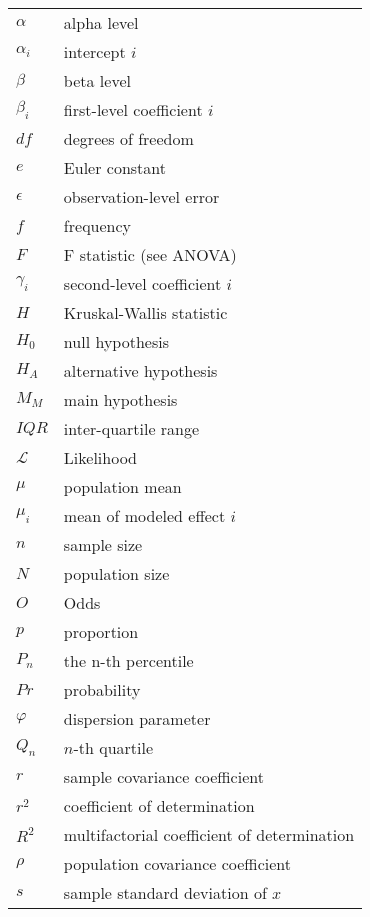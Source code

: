 \begin{longtable}{p{}p{}}
  $\alpha$          & alpha level \\
  $\alpha_i$        & intercept $i$ \\
  $\beta$           & beta level \\
  $\beta_i$         & first-level coefficient $i$ \\
  $df$              & degrees of freedom \\
  $e$               & Euler constant \\
  $\epsilon$        & observation-level error \\
  $f$               & frequency \\
  $F$               & F statistic (see ANOVA)\\
  $\gamma_i$        & second-level coefficient $i$ \\
  $H$               & Kruskal-Wallis statistic \\
  $H_0$             & null hypothesis \\
  $H_A$             & alternative hypothesis \\
  $M_M$             & main hypothesis \\
  $IQR$             & inter-quartile range \\
  $\mathcal{L}$     & Likelihood \\
  $\mu$             & population mean \\
  $\mu_i$           & mean of modeled effect $i$ \\
  $n$               & sample size \\
  $N$               & population size \\
  $O$               & Odds \\
  $p$               & proportion \\
  $P_n$             & the n-th percentile \\
  $Pr$              & probability \\
  $\varphi$         & dispersion parameter \\
  $Q_n$             & $n$-th quartile \\
  $r$               & sample covariance coefficient \\
  $r^2$             & coefficient of determination \\
  $R^2$             & multifactorial coefficient of determination \\
  $\rho$            & population covariance coefficient \\
  $s$               & sample standard deviation of $x$ \\

\end{longtable}
